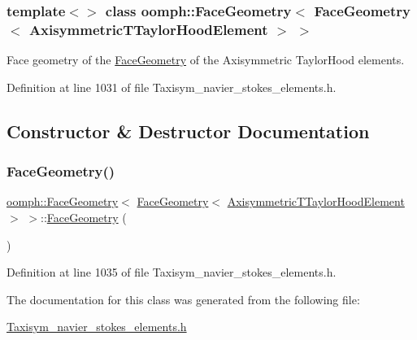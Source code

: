 \subsubsection*{template$<$$>$\newline
class oomph\+::\+Face\+Geometry$<$ Face\+Geometry$<$ Axisymmetric\+T\+Taylor\+Hood\+Element $>$ $>$}

Face geometry of the \hyperlink{classoomph_1_1FaceGeometry}{Face\+Geometry} of the Axisymmetric Taylor\+Hood elements. 

Definition at line 1031 of file Taxisym\+\_\+navier\+\_\+stokes\+\_\+elements.\+h.



\subsection{Constructor \& Destructor Documentation}
\mbox{\label{classoomph_1_1FaceGeometry_3_01FaceGeometry_3_01AxisymmetricTTaylorHoodElement_01_4_01_4_ad7284ed35b1ffd92b75a1535ea947799}} 
\subsubsection{\texorpdfstring{Face\+Geometry()}{FaceGeometry()}}
{\footnotesize\ttfamily \hyperlink{classoomph_1_1FaceGeometry}{oomph\+::\+Face\+Geometry}$<$ \hyperlink{classoomph_1_1FaceGeometry}{Face\+Geometry}$<$ \hyperlink{classoomph_1_1AxisymmetricTTaylorHoodElement}{Axisymmetric\+T\+Taylor\+Hood\+Element} $>$ $>$\+::\hyperlink{classoomph_1_1FaceGeometry}{Face\+Geometry} (\begin{DoxyParamCaption}{ }\end{DoxyParamCaption})\hspace{0.3cm}{\ttfamily [inline]}}



Definition at line 1035 of file Taxisym\+\_\+navier\+\_\+stokes\+\_\+elements.\+h.



The documentation for this class was generated from the following file\+:\begin{DoxyCompactItemize}
\item 
\hyperlink{Taxisym__navier__stokes__elements_8h}{Taxisym\+\_\+navier\+\_\+stokes\+\_\+elements.\+h}\end{DoxyCompactItemize}
